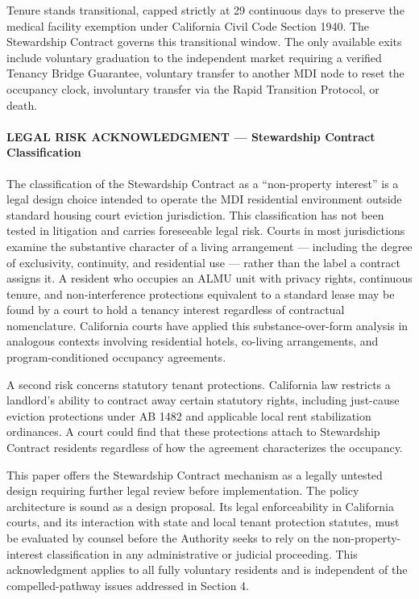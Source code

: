 \documentclass[12pt, letterpaper]{article}
\begin{document}
Tenure stands transitional, capped strictly at 29 continuous days to preserve the medical facility exemption under California Civil Code Section 1940. The Stewardship Contract governs this transitional window. The only available exits include voluntary graduation to the independent market requiring a verified Tenancy Bridge Guarantee, voluntary transfer to another MDI node to reset the occupancy clock, involuntary transfer via the Rapid Transition Protocol, or death.

\paragraph{LEGAL RISK ACKNOWLEDGMENT — Stewardship Contract Classification}
The classification of the Stewardship Contract as a “non-property interest” is a legal design choice intended to operate the MDI residential environment outside standard housing court eviction jurisdiction. This classification has not been tested in litigation and carries foreseeable legal risk. Courts in most jurisdictions examine the substantive character of a living arrangement — including the degree of exclusivity, continuity, and residential use — rather than the label a contract assigns it. A resident who occupies an ALMU unit with privacy rights, continuous tenure, and non-interference protections equivalent to a standard lease may be found by a court to hold a tenancy interest regardless of contractual nomenclature. California courts have applied this substance-over-form analysis in analogous contexts involving residential hotels, co-living arrangements, and program-conditioned occupancy agreements.

A second risk concerns statutory tenant protections. California law restricts a landlord's ability to contract away certain statutory rights, including just-cause eviction protections under AB 1482 and applicable local rent stabilization ordinances. A court could find that these protections attach to Stewardship Contract residents regardless of how the agreement characterizes the occupancy.

This paper offers the Stewardship Contract mechanism as a legally untested design requiring further legal review before implementation. The policy architecture is sound as a design proposal. Its legal enforceability in California courts, and its interaction with state and local tenant protection statutes, must be evaluated by counsel before the Authority seeks to rely on the non-property-interest classification in any administrative or judicial proceeding. This acknowledgment applies to all fully voluntary residents and is independent of the compelled-pathway issues addressed in Section 4.
\end{document}
